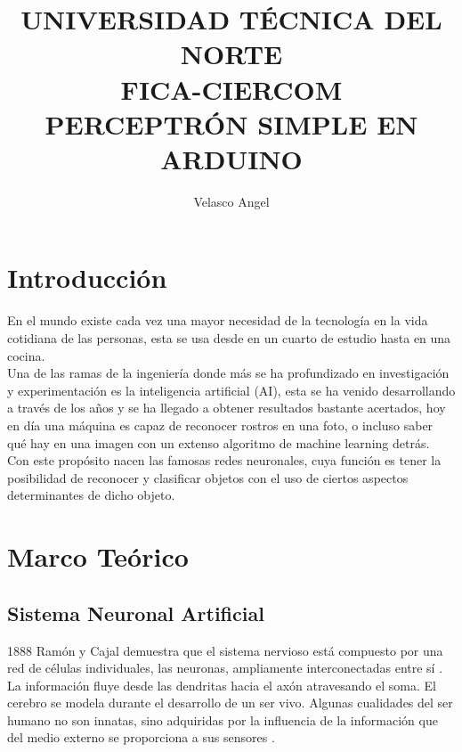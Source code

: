 \documentclass[10pt,a4paper]{article}
\begin{document}
\author{Velasco Angel}
\title{UNIVERSIDAD TÉCNICA DEL NORTE \\
FICA-CIERCOM\\
PERCEPTRÓN SIMPLE EN ARDUINO}
\maketitle
\section{Introducción}
En el mundo existe cada vez una mayor necesidad de la tecnología en la vida cotidiana de las personas, esta se usa desde en un cuarto de estudio hasta en una cocina.\\
Una de las ramas de la ingeniería donde más se ha profundizado en investigación y experimentación es la inteligencia artificial (AI), esta se ha venido desarrollando a través de los años y se ha llegado a obtener resultados bastante acertados, hoy en día una máquina es capaz de reconocer rostros en una foto, o incluso saber qué hay en una imagen con un extenso algoritmo de machine learning detrás. \\

Con este propósito nacen las famosas redes neuronales, cuya función es tener la posibilidad de reconocer y clasificar objetos con el uso de ciertos aspectos determinantes de dicho objeto.

\section{Marco Teórico}
\subsection{Sistema Neuronal Artificial}
1888 Ramón y Cajal demuestra que el sistema nervioso está compuesto por
una red de células individuales, las neuronas, ampliamente interconectadas
entre sí \cite{Larranaga}.\\
La información fluye desde las dendritas hacia el axón atravesando el soma. El cerebro se modela durante el desarrollo de un ser vivo. Algunas cualidades del ser humano no son innatas, sino adquiridas por la influencia de la
información que del medio externo se proporciona a sus sensores \cite{Larranaga}.
\end{document}
